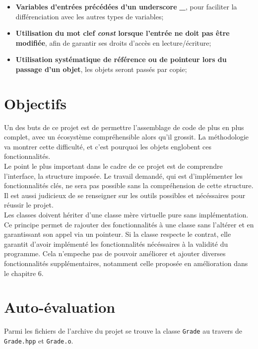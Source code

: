 \documentclass[9pts]{article}
\begin{document}
\begin{itemize}
\item \textbf{Variables d'entrées précédées d'un underscore \emph{\_}}, pour faciliter la différenciation avec les autres types de variables;
\item \textbf{Utilisation du mot clef \emph{const} lorsque l'entrée ne doit pas être modifiée}, afin de garantir ses droits d'accès en lecture/écriture;
\item \textbf{Utilisation systématique de référence ou de pointeur lors du passage d'un objet}, les objets seront passés par copie;
\end{itemize}

\pagebreak

\section{Objectifs}

Un des buts de ce projet est de permettre l'assemblage de code de plus en plus complet, avec un écosystème compréhensible alors qu'il grossit. La méthodologie va montrer cette difficulté, et
c'est pourquoi les objets englobent ces fonctionnalités. \\

Le point le plus important dans le cadre de ce projet est de comprendre l'interface, la structure imposée. Le travail demandé, qui est d'implémenter les fonctionnalités clés, ne sera pas possible sans la compréhension de cette structure. Il est aussi judicieux de se renseigner sur les outils possibles et nécéssaires pour réussir le projet.\\

Les classes doivent hériter d'une classe mère virtuelle pure sans implémentation. Ce principe permet de rajouter des fonctionnalités à une classe sans l'altérer et en garantissant son appel via un pointeur.
Si la classe respecte le contrat, elle garantit d'avoir implémenté les fonctionnalités nécéssaires à la validité du programme. Cela n'empeche pas de pouvoir améliorer et ajouter diverses fonctionnalités supplémentaires, notamment celle proposée en amélioration dans le chapitre 6. \\

\section{Auto-évaluation}
\label{sec::autoeval}
Parmi les fichiers de l'archive du projet se trouve la classe \texttt{Grade} au travers de \texttt{Grade.hpp} et \texttt{Grade.o}.\\
\end{document}
